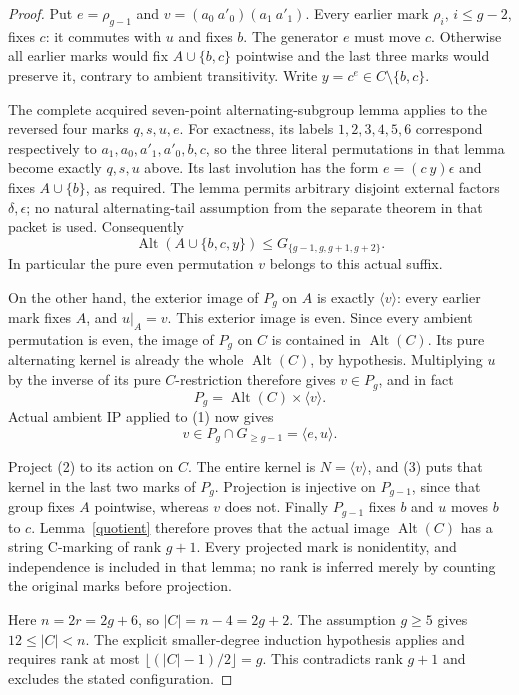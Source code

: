 \documentclass[11pt,a4paper]{article}
\newcommand{\gen}[1]{\langle#1\rangle}
\begin{document}
\begin{proof}
Put $e=\rho_{g-1}$ and
$v=(a_0\ a'_0)(a_1\ a'_1)$. Every earlier mark
$\rho_i$, $i\le g-2$, fixes $c$: it commutes with $u$ and
fixes $b$. The generator $e$ must move $c$. Otherwise all
earlier marks would fix $A\cup\{b,c\}$ pointwise and the
last three marks would preserve it, contrary to ambient
transitivity. Write $y=c^e\in C\setminus\{b,c\}$.

The complete acquired seven-point alternating-subgroup lemma
applies to the reversed four marks $q,s,u,e$. For exactness,
its labels $1,2,3,4,5,6$ correspond respectively to
$a_1,a_0,a'_1,a'_0,b,c$, so the three literal permutations
in that lemma become exactly $q,s,u$ above. Its last involution
has the form $e=(c\ y)\epsilon$ and fixes $A\cup\{b\}$,
as required. The lemma permits arbitrary disjoint external
factors $\delta,\epsilon$; no natural alternating-tail
assumption from the separate theorem in that packet is used.
Consequently
\[
 \operatorname{Alt}(A\cup\{b,c,y\})\le
                         G_{\{g-1,g,g+1,g+2\}}.       \tag{1}
\]
In particular the pure even permutation $v$ belongs to this
actual suffix.

On the other hand, the exterior image of $P_g$ on $A$ is
exactly $\gen v$: every earlier mark fixes $A$, and $u|_A=v$.
This exterior image is even. Since every ambient permutation
is even, the image of $P_g$ on $C$ is contained in
$\operatorname{Alt}(C)$. Its pure alternating kernel is
already the whole $\operatorname{Alt}(C)$, by hypothesis.
Multiplying $u$ by the inverse of its pure $C$-restriction
therefore gives $v\in P_g$, and in fact
\[
                      P_g=\operatorname{Alt}(C)\times\gen v.
                                                               \tag{2}
\]
Actual ambient IP applied to (1) now gives
\[
                      v\in P_g\cap G_{\ge g-1}=\gen{e,u}.
                                                               \tag{3}
\]

Project (2) to its action on $C$. The entire kernel is
$N=\gen v$, and (3) puts that kernel in the last two marks
of $P_g$. Projection is injective on $P_{g-1}$, since that
group fixes $A$ pointwise, whereas $v$ does not. Finally
$P_{g-1}$ fixes $b$ and $u$ moves $b$ to $c$.
Lemma~\ref{quotient} therefore proves that the actual image
$\operatorname{Alt}(C)$ has a string C-marking of rank $g+1$.
Every projected mark is nonidentity, and independence is
included in that lemma; no rank is inferred merely by counting
the original marks before projection.

Here $n=2r=2g+6$, so $|C|=n-4=2g+2$.
The assumption $g\ge5$ gives $12\le |C|<n$.
The explicit smaller-degree induction hypothesis applies and
requires rank at most
$\lfloor(|C|-1)/2\rfloor=g$. This contradicts rank $g+1$
and excludes the stated configuration.
\end{proof}
\end{document}
